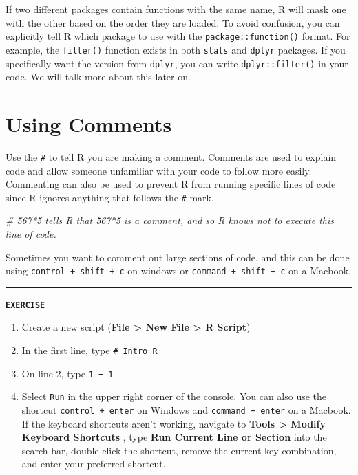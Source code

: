 \documentclass[
]{book}
\newenvironment{Shaded}{\begin{snugshade}}{\end{snugshade}}
\newcommand{\CommentTok}[1]{\textcolor[rgb]{0.56,0.35,0.01}{\textit{#1}}}
\providecommand{\tightlist}{%
  \setlength{\itemsep}{0pt}\setlength{\parskip}{0pt}}
\begin{document}
If two different packages contain functions with the same name, R will mask one with the other based on the order they are loaded. To avoid confusion, you can explicitly tell R which package to use with the \texttt{package::function()} format. For example, the \texttt{filter()} function exists in both \texttt{stats} and \texttt{dplyr} packages. If you specifically want the version from \texttt{dplyr}, you can write \texttt{dplyr::filter()} in your code. We will talk more about this later on.

\section{Using Comments}\label{using-comments}

Use the \texttt{\#} to tell R you are making a comment. Comments are used to explain code and allow someone unfamiliar with your code to follow more easily. Commenting can also be used to prevent R from running specific lines of code since R ignores anything that follows the \texttt{\#} mark.

\begin{Shaded}
\begin{Highlighting}[]
\CommentTok{\# 567*5 tells R that 567*5 is a comment, and so R knows not to execute this line of code.}
\end{Highlighting}
\end{Shaded}

Sometimes you want to comment out large sections of code, and this can be done using \texttt{control\ +\ shift\ +\ c} on windows or \texttt{command\ +\ shift\ +\ c} on a Macbook.

\begin{center}\rule{0.5\linewidth}{0.5pt}\end{center}

\textbf{\texttt{EXERCISE}}

\begin{enumerate}
\def\labelenumi{\arabic{enumi}.}
\tightlist
\item
  Create a new script (\textbf{File \textgreater{} New File \textgreater{} R Script})
\item
  In the first line, type \texttt{\#\ Intro\ R}
\item
  On line 2, type \texttt{1\ +\ 1}
\item
  Select \texttt{Run} in the upper right corner of the console. You can also use the shortcut \texttt{control\ +\ enter} on Windows and \texttt{command\ +\ enter} on a Macbook. If the keyboard shortcuts aren't working, navigate to \textbf{Tools \textgreater{} Modify Keyboard Shortcuts }, type \textbf{Run Current Line or Section} into the search bar, double-click the shortcut, remove the current key combination, and enter your preferred shortcut.
\end{enumerate}
\end{document}
